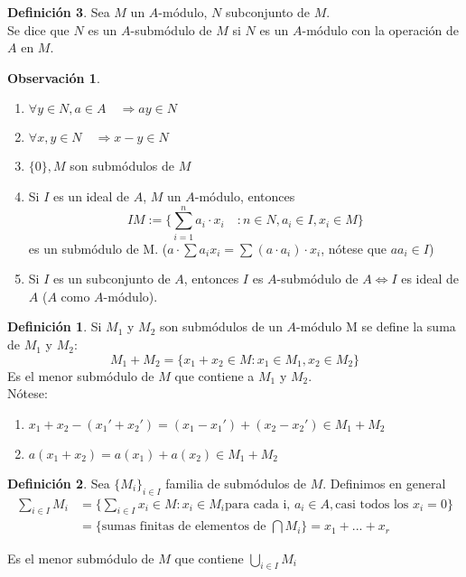 \documentclass{article}
\theoremstyle{theorem-style}  %
\theoremstyle{definition}
\newtheorem{definition}{Definición}[section]
\newtheorem*{observation}{Observación} %
\theoremstyle{example-style}
\begin{document}
\begin{definition}
	Sea $M$ un $A$-módulo, $N$ subconjunto de $M$.\\
	Se dice que $N$ es un $A$-submódulo de $M$ si $N$ es un $A$-módulo con la operación de $A$ en $M$.
	\begin{observation}
		\
		\begin{enumerate}
			\item $ \forall y \in N, a \in A \quad\Rightarrow ay\in N$
			\item $\forall x,y\in N  \quad \Rightarrow x-y \in N$
			\item $\{0\}, M$ son submódulos de $M$
			\item Si $I$ es un ideal de $A$, $M$ un $A$-módulo, entonces
			\[IM:=\{ \sum_{i=1}^{n} a_i\cdot x_i \quad : n \in N, a_i \in I, x_i \in M\}\]
			es un submódulo de M. ($a \cdot \sum a_i x_i = \sum (a\cdot a_i) \cdot x_i$, nótese que $aa_i\in I$)

			\item Si $I$ es un subconjunto de $A$, entonces $ I $ es $ A $-submódulo de $ A \Leftrightarrow I $ es ideal de $ A $ ($ A $ como $ A $-módulo).
		\end{enumerate}
	\end{observation}
		\begin{definition}
			Si $ M_1 $ y $ M_2 $ son submódulos de un $ A $-módulo M se define la suma de $M_1 $ y $ M_2$:
			\[ M_1+M_2 = \{x_1+x_2 \in M : x_1\in M_1, x_2 \in M_2\}\]
			Es el menor submódulo de $ M $ que contiene a $ M_1 $ y $ M_2 $.\\
			Nótese:
			\begin{enumerate}
				\item $ x_1+x_2-(x_1'+x_2') = (x_1-x_1')+ (x_2-x_2') \in M_1+M_2 $
				\item $ a(x_1+x_2)=a(x_1)+a(x_2)\in M_1+M_2 $
			\end{enumerate}
		\end{definition}


	\begin{definition}
		Sea $ \{M_i\}_{i\in I} $ familia de submódulos de $ M $. Definimos en general
		\begin{align*}
			\sum_{i\in I}M_i &= \{\sum_{i\in I}x_i \in M : x_i\in M_i \text{para cada i, }a_i\in A, \text{casi todos los }x_i=0\}\\
			&= \{\text{sumas finitas de elementos de }\bigcap M_i\}=x_1+...+x_r
		\end{align*}

		Es el menor submódulo de $ M $ que contiene $ \bigcup_{i\in I} M_i $
	\end{definition}

\end{definition}
\end{document}
